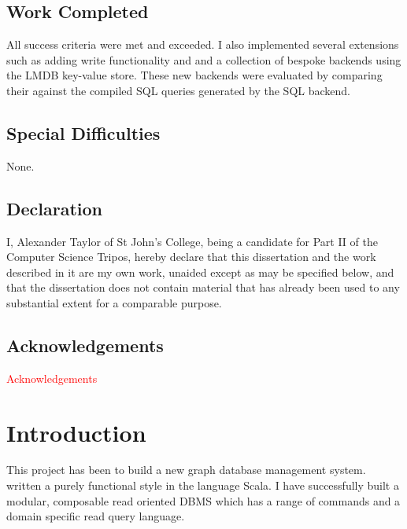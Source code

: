 \documentclass[12pt,a4paper,twoside,openright]{report}
\newcommand\todo[1]{\textcolor{red}{#1}}
\begin{document}
\section*{Work Completed}

All success criteria were met and exceeded. I also implemented several extensions such as adding write functionality and and a collection of bespoke backends using the LMDB key-value store. These new backends were evaluated by comparing their against the compiled SQL queries generated by the SQL backend.

\section*{Special Difficulties}

None.
 
\newpage
\section*{Declaration}

I, Alexander Taylor of St John's College, being a candidate for Part II of the Computer
Science Tripos, hereby declare
that this dissertation and the work described in it are my own work,
unaided except as may be specified below, and that the dissertation
does not contain material that has already been used to any substantial
extent for a comparable purpose.

\bigskip
{}

\medskip
{}

\tableofcontents

\listoffigures

\newpage
\section*{Acknowledgements}

\todo{Acknowledgements}


\pagestyle{headings}

\chapter{Introduction}
This project has been to build a new graph database management system. written a purely functional style in the language Scala. I have successfully built a modular, composable read oriented DBMS which has a range of commands and a domain specific read query language. 
\end{document}
